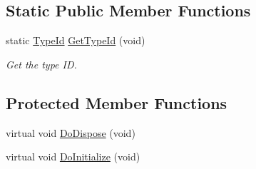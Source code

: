 \subsection*{Static Public Member Functions}
\begin{DoxyCompactItemize}
\item 
static \hyperlink{classns3_1_1TypeId}{Type\+Id} \hyperlink{classns3_1_1Application_a76acca40e059541f23110dfe32c266cd}{Get\+Type\+Id} (void)
\begin{DoxyCompactList}\small\item\em Get the type ID. \end{DoxyCompactList}\end{DoxyCompactItemize}
\subsection*{Protected Member Functions}
\begin{DoxyCompactItemize}
\item 
virtual void \hyperlink{classns3_1_1Application_a89f6c9454532d62600251872bede6d04}{Do\+Dispose} (void)
\item 
virtual void \hyperlink{classns3_1_1Application_a5eb6dbd210418f3a0ec5a2515fc3a009}{Do\+Initialize} (void)
\end{DoxyCompactItemize}
